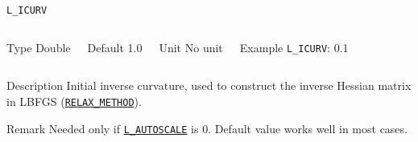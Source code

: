 \documentclass[xcolor=dvipsnames,t]{beamer}
\begin{document}
\begin{frame}[allowframebreaks]{\texttt{L\_ICURV}} \label{L_ICURV}
\vspace*{-12pt}
\begin{columns}
\begin{block}{Type}
Double
\end{block}

\begin{block}{Default}
1.0
\end{block}

\begin{block}{Unit}
No unit
\end{block}

\begin{block}{Example}
\texttt{L\_ICURV}: 0.1
\end{block}
\end{columns}

\begin{block}{Description}
Initial inverse curvature, used to construct the inverse Hessian matrix in LBFGS (\hyperlink{RELAX_METHOD}{\texttt{RELAX\_METHOD}}). 
\end{block}

\begin{block}{Remark}
Needed only if  \hyperlink{L_AUTOSCALE}{\texttt{L\_AUTOSCALE}} is $0$. Default value works well in most cases.
\end{block}

\end{frame}
\end{document}
